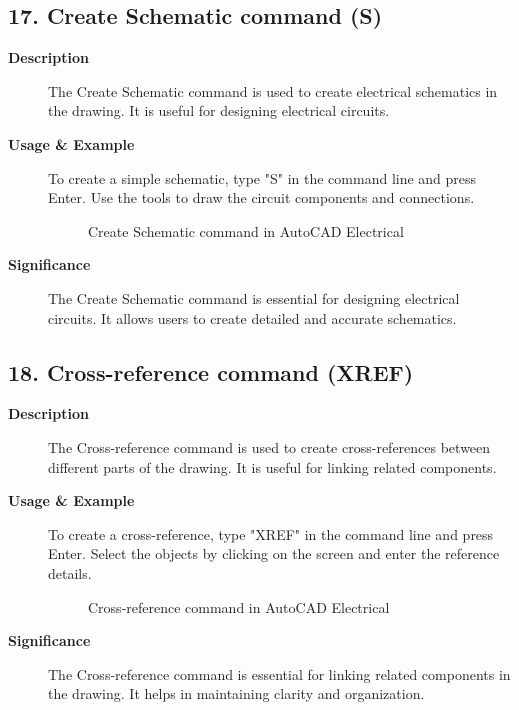 \documentclass[12pt]{article}
\begin{document}
\subsection*{17. Create Schematic command (S)}
\begin{description}
    \item [\textbf{Description}] The Create Schematic command is used to create electrical schematics in the drawing. It is useful for designing electrical circuits.
    \item [\textbf{Usage \& Example}]To create a simple schematic, type "S" in the command line and press Enter. Use the tools to draw the circuit components and connections.
          \begin{figure}[H]
              \centering
              \caption{Create Schematic command in AutoCAD Electrical}
          \end{figure}
    \item [\textbf{Significance}] The Create Schematic command is essential for designing electrical circuits. It allows users to create detailed and accurate schematics.
\end{description}

\subsection*{18. Cross-reference command (XREF)}
\begin{description}
    \item [\textbf{Description}] The Cross-reference command is used to create cross-references between different parts of the drawing. It is useful for linking related components.
    \item [\textbf{Usage \& Example}] To create a cross-reference, type "XREF" in the command line and press Enter. Select the objects by clicking on the screen and enter the reference details.
          \begin{figure}[H]
              \centering
              \caption{Cross-reference command in AutoCAD Electrical}
          \end{figure}
    \item [\textbf{Significance}] The Cross-reference command is essential for linking related components in the drawing. It helps in maintaining clarity and organization.
\end{description}
\end{document}
